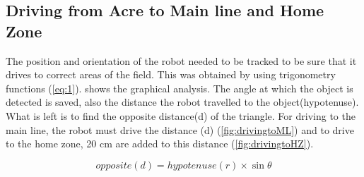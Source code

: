 \newpage
\subsection{Driving from Acre to Main line and Home Zone}
\noindent The position and orientation of the robot needed to be tracked to be sure that it drives to correct areas of the field. This was obtained by using trigonometry functions (\vref{eq:1}).  shows the graphical analysis. The angle at which the object is detected is saved, also the distance the robot travelled to the object(hypotenuse). What is left is to find the opposite distance(d) of the triangle. For driving to the main line, the robot must drive the distance (d) (\vref{fig:drivingtoML}) and to drive to the home zone, 20 cm are added to this distance (\vref{fig:drivingtoHZ}).


\begin{equation}
	opposite(d) = hypotenuse(r) \times \sin \theta \label{eq:1}
\end{equation}

